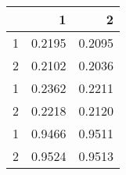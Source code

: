 \begin{tabular}{lrr}
\toprule
{} &       1 &       2 \\
\midrule
1 &  0.2195 &  0.2095 \\
2 &  0.2102 &  0.2036 \\
1 &  0.2362 &  0.2211 \\
2 &  0.2218 &  0.2120 \\
1 &  0.9466 &  0.9511 \\
2 &  0.9524 &  0.9513 \\
\bottomrule
\end{tabular}

